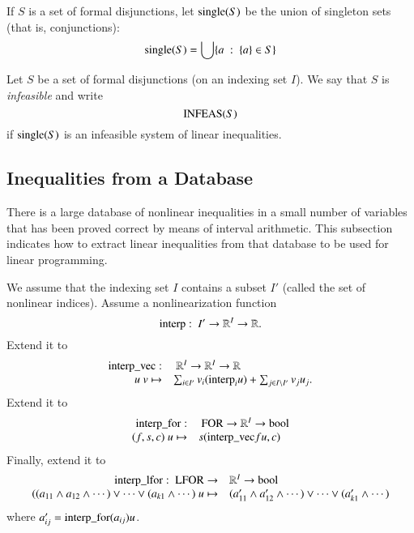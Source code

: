 If $S$ is a set of formal disjunctions, let ${\operatorname{single}}(S)$ be
the union of singleton sets (that is, conjunctions):
    $$
    {\operatorname{single}}(S) = \bigcup \{a \ :\  \{a\} \in S\}
    $$

\begin{definition}
Let $S$ be a set of formal disjunctions (on an indexing set $I$).
We say that $S$ is {\it infeasible} and write
    $${\operatorname{INFEAS}}(S)$$
if ${\operatorname{single}}(S)$ is an infeasible system of linear
inequalities.
\end{definition}


\subsection{Inequalities from a Database}
\label{sec:lookup}

There is a large database of nonlinear inequalities in a small
number of variables that has been proved correct by means of
interval arithmetic.  This subsection indicates how to extract
linear inequalities from that database to be used for linear
programming.


We assume that the indexing set $I$ contains a subset $I'$ (called
the set of nonlinear indices). Assume a nonlinearization function
    $$
    {\operatorname{interp}}:\ I' \to \mathbb{R}^{I} \to \mathbb{R}.
    $$
Extend it to
    $$
    \begin{array}{rll}
    {\operatorname{interp\_vec}}:&\ \mathbb{R}^{I} \to \mathbb{R}^I \to
    \mathbb{R}\\
    u\ v \mapsto& \sum_{i\in I'} v_i ({\operatorname{interp}}_i u) +
        \sum_{j\in I\setminus I'} v_j u_j.
    \end{array}
    $$
Extend it to
    $$
    \begin{array}{rll}
    {\operatorname{interp\_for}}:&\ {\operatorname{FOR}}\to\mathbb{R}^I\to\operatorname{bool}\\
    (f,s,c)\ u\mapsto& s({\operatorname{interp\_vec}} f u,c)\\
    \end{array}
    $$
Finally, extend it to
    $$
    \begin{array}{rll}
    {\operatorname{interp\_lfor}}:\ {\operatorname{LFOR}}\to&\mathbb{R}^I\to\operatorname{bool}\\
    ((a_{11}\wedge a_{12}\wedge\cdots) \vee \cdots \vee (a_{k1}\wedge
    \cdots)\ u\mapsto& (a'_{11}\wedge a'_{12}\wedge\cdots) \vee \cdots \vee (a'_{k1}\wedge
    \cdots)\\
    \end{array}
    $$
where $a'_{ij} = {\operatorname{interp\_for}} (a_{ij}) u$.


